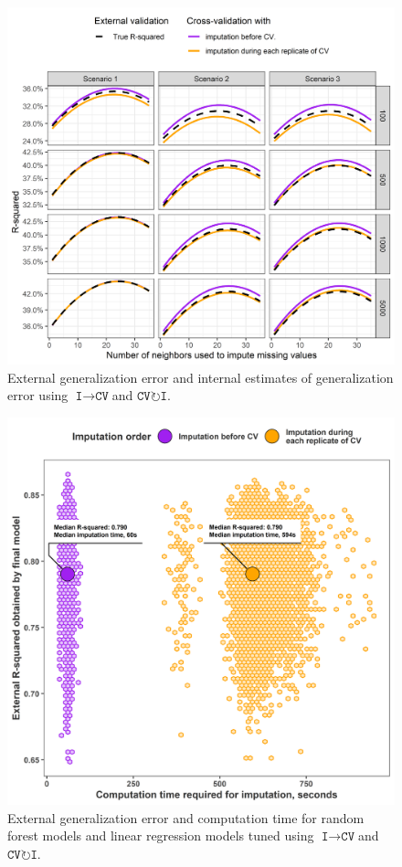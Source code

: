 \documentclass[AMA,STIX1COL,doublespace]{WileyNJD-v2}
\begin{document}
\begin{figure}
\includegraphics[width=1\linewidth]{figs/fig_trends_by_nbrs} 
\caption{External generalization error and internal estimates of generalization error using $\texttt{I}\!\!\rightarrow\!\texttt{CV}$\space and $\texttt{CV}\!\circlearrowright\!\texttt{I}$.}
\label{fig:sim_r2}
\end{figure}

\begin{figure}
\includegraphics{figs/fig_ames_cmp_time} 
\caption{External generalization error and computation time for random forest models and linear regression models tuned using $\texttt{I}\!\!\rightarrow\!\texttt{CV}$\space and $\texttt{CV}\!\circlearrowright\!\texttt{I}$.}
\label{fig:ames_cmp_time}
\end{figure}

\FloatBarrier


\end{document}

